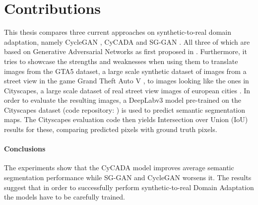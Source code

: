 \section{Contributions}
This thesis compares three current approaches on synthetic-to-real domain adaptation, namely CycleGAN \cite{DBLP:journals/corr/ZhuPIE17}, CyCADA \cite{DBLP:journals/corr/abs-1711-03213} and SG-GAN \cite{DBLP:journals/corr/abs-1801-01726}. All three of which are based on Generative Adversarial Networks as first proposed in \cite{NIPS2014_5423}. Furthermore, it tries to showcase the strengths and weaknesses when using them to translate images from the GTA5 dataset, a large scale synthetic dataset of images from a street view in the game Grand Theft Auto V \cite{Richter_2016_ECCV}, to images looking like the ones in Cityscapes, a large scale dataset of real street view images of european cities \cite{Cordts_2016_CVPR}. In order to evaluate the resulting images, a DeepLabv3 \cite{DBLP:journals/corr/ChenPSA17} model pre-trained on the Cityscapes dataset (code repository: \cite{DLR}) is used to predict semantic segmentation maps. The Cityscapes evaluation code \cite{CSR} then yields Intersection over Union (IoU) results for these, comparing predicted pixels with ground truth pixels. 
\paragraph{Conclusions} The experiments show that the CyCADA model improves average semantic segmentation performance while SG-GAN and CycleGAN worsens it. The results suggest that in order to successfully perform synthetic-to-real Domain Adaptation the models have to be carefully trained.